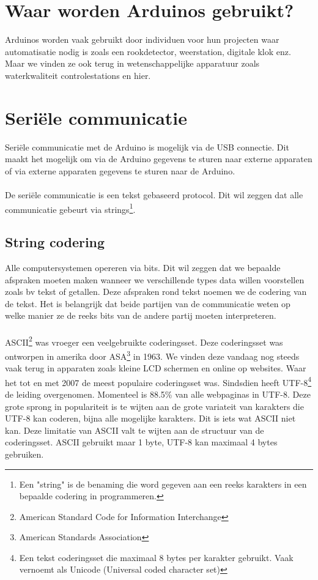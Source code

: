 \documentclass[10pt,twoside]{report}
\begin{document}
\section{Waar worden Arduinos gebruikt?}
Arduinos worden vaak gebruikt door individuen voor hun projecten waar automatisatie nodig is zoals een rookdetector, weerstation, digitale klok enz. Maar we vinden ze ook terug in wetenschappelijke apparatuur zoals waterkwaliteit controlestations en hier.
\section{Seriële communicatie}
Seriële communicatie met de Arduino is mogelijk via de USB connectie. Dit maakt het mogelijk om via de Arduino gegevens te sturen naar externe apparaten of via externe apparaten gegevens te sturen naar de Arduino.
\\\\
De seriële communicatie is een tekst gebaseerd protocol. Dit wil zeggen dat alle communicatie gebeurt via strings\footnote{Een "string" is de benaming die word gegeven aan een reeks karakters in een bepaalde codering in programmeren.}.\\
\subsection{String codering}
Alle computersystemen opereren via bits. Dit wil zeggen dat we bepaalde afspraken moeten maken wanneer we verschillende types data willen voorstellen zoals bv tekst of getallen. Deze afspraken rond tekst noemen we de codering van de tekst. Het is belangrijk dat beide partijen van de communicatie weten op welke manier ze de reeks bits van de andere partij moeten interpreteren.\\\\
ASCII\footnote{American Standard Code for Information Interchange} was vroeger een veelgebruikte coderingsset. Deze coderingsset was ontworpen in amerika door ASA\footnote{American Standards Association} in 1963. We vinden deze vandaag nog steeds vaak terug in apparaten zoals kleine LCD schermen en online op websites. Waar het tot en met 2007 de meest populaire coderingsset was. Sindsdien heeft UTF-8\footnote{Een tekst coderingsset die maximaal 8 bytes per karakter gebruikt. Vaak vernoemt als Unicode (Universal coded character set)} de leiding overgenomen. Momenteel is 88.5\% van alle webpaginas in UTF-8\cite{UnicodeStatistics}. Deze grote sprong in populariteit is te wijten aan de grote variateit van karakters die UTF-8 kan coderen, bijna alle mogelijke karakters. Dit is iets wat ASCII niet kan. Deze limitatie van ASCII valt te wijten aan de structuur van de coderingsset. ASCII gebruikt maar 1 byte, UTF-8 kan maximaal 4 bytes gebruiken.
\end{document}
